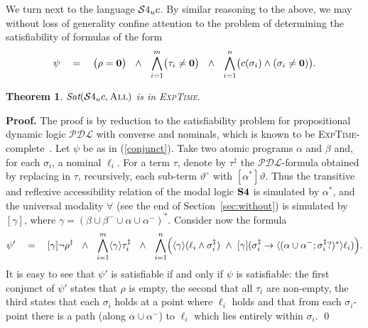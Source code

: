 \documentclass{LMCS}
\renewenvironment{proof}{\par\noindent\textbf{Proof.}}{\mbox{}\qed\par\medskip}
\theoremstyle{plain}
\newtheorem{theorem}[thm]{Theorem}
\newcommand{\ti}[2][]{#2^{\circ_{#1}}}
\newcommand{\Sat}{\textit{Sat}}
\newcommand{\All}{\textsc{All}}
\newcommand{\ExpTime}{\textsc{ExpTime}}
\begin{document}
We turn next to the language $\mathcal{S}4_u{}c$. By similar reasoning to the
above, we may without loss of generality confine attention to the
problem of determining the satisfiability of formulas of the form
\begin{align}\label{conjunct}
\psi \quad=\quad
\bigl(\rho = \mathbf{0} \bigr) \ \ \land \
\ \bigwedge_{i = 1}^m \bigl(\tau_i \ne \mathbf{0}\bigr) \ \ \land \ \
\bigwedge_{i = 1}^n
\bigl(c(\sigma_i)\land(\sigma_i\ne\mathbf{0})\bigr).
\end{align}

\begin{theorem}\label{theorem:S4uc:ExpTime}
$\Sat(\conT,\All)$ is in \ExpTime{}.
\end{theorem}
\begin{proof}
The proof is by reduction to the satisfiability problem for
propositional dynamic logic $\mathcal{PDL}$ with converse and
nominals, which is known to be \ExpTime-complete~\cite[Section
  7.3]{deGiacomo95}.  Let $\psi$ be as in (\ref{conjunct}). Take two
atomic programs $\alpha$ and $\beta$ and, for each $\sigma_i$, a
nominal $\ell_i$. For a term $\tau$, denote by $\tau^\ddagger$ the
$\mathcal{PDL}$-formula obtained by replacing in $\tau$, recursively,
each sub-term $\ti{\vartheta}$ with $[\alpha^{\ast}]\vartheta$. Thus
the transitive and reflexive accessibility
relation of the modal logic ${\bf S4}$ is
simulated by $\alpha^{\ast}$,
and the universal modality $\forall$ (see the end
of Section~\ref{sec:without}) is simulated by $[\gamma]$, where
$\gamma = (\beta \cup \beta^- \cup \alpha \cup
\alpha^-)^{\ast}$. Consider now the formula
\begin{equation*}
\psi'\quad=\quad[\gamma]\neg \rho^\ddagger \ \ \wedge \ \
\bigwedge_{i=1}^m \langle\gamma\rangle \tau_i^\ddagger \ \ \wedge \
\ \bigwedge_{i=1}^n \Bigl(\langle\gamma\rangle (\ell_i \wedge
\sigma_i^\ddagger) \ \wedge \ [\gamma](\sigma_i^\ddagger
\rightarrow \langle (\alpha \cup
\alpha^-;\sigma_i^\ddagger?)^\ast\rangle \ell_i)\Bigr).
\end{equation*}
It is easy to see that $\psi'$ is satisfiable
if and only if $\psi$ is satisfiable: the first conjunct of $\psi'$ states that
$\rho$ is empty, the second that all $\tau_i$ are non-empty, the third
states that each $\sigma_i$ holds at a point where $\ell_i$ holds and
that from each $\sigma_i$-point there is a path (along
$\alpha\cup\alpha^-$) to $\ell_i$ which lies entirely within
$\sigma_i$.
\end{proof}
\end{document}
